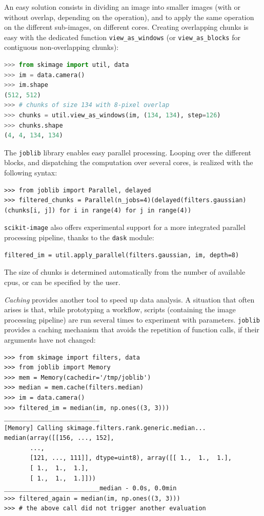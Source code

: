 \documentclass[twocolumn]{bmcart}%
\begin{document}
An easy solution consists in dividing an image into smaller images (with
or without overlap, depending on the operation), and to apply the
same operation on the different sub-images, on different cores. Creating overlapping chunks is easy with the dedicated function \texttt{view\_as\_windows} (or \texttt{view\_as\_blocks} for contiguous non-overlapping chunks):
\begin{lstlisting}[language=Python]
>>> from skimage import util, data
>>> im = data.camera()
>>> im.shape
(512, 512)
>>> # chunks of size 134 with 8-pixel overlap
>>> chunks = util.view_as_windows(im, (134, 134), step=126)
>>> chunks.shape
(4, 4, 134, 134)
\end{lstlisting}
The \texttt{joblib} library enables easy parallel processing. Looping over the different blocks, and dispatching the computation over several cores, is realized with the following syntax:
\begin{lstlisting}
>>> from joblib import Parallel, delayed
>>> filtered_chunks = Parallel(n_jobs=4)(delayed(filters.gaussian)(chunks[i, j]) for i in range(4) for j in range(4))
\end{lstlisting}
\texttt{scikit-image} also offers experimental support for a more integrated parallel processing pipeline, thanks to the \texttt{dask} \citep{dask} module:
\begin{lstlisting}
filtered_im = util.apply_parallel(filters.gaussian, im, depth=8)
\end{lstlisting}
The size of chunks is determined automatically from the number of available cpus, or can be specified by the user.

{\em Caching} provides another tool to speed up data analysis. A situation
that often arises is that, while prototyping a workflow, scripts
(containing the image processing pipeline) are run several times to
experiment with parameters. \texttt{joblib} provides a caching mechanism
that avoids the repetition of function calls, if their arguments have not
changed:
\begin{lstlisting}
>>> from skimage import filters, data
>>> from joblib import Memory
>>> mem = Memory(cachedir='/tmp/joblib')
>>> median = mem.cache(filters.median)
>>> im = data.camera()
>>> filtered_im = median(im, np.ones((3, 3)))
__________________________
[Memory] Calling skimage.filters.rank.generic.median...
median(array([[156, ..., 152],
       ..., 
       [121, ..., 111]], dtype=uint8), array([[ 1.,  1.,  1.],
       [ 1.,  1.,  1.],
       [ 1.,  1.,  1.]]))
__________________________median - 0.0s, 0.0min
>>> filtered_again = median(im, np.ones((3, 3)))
>>> # the above call did not trigger another evaluation
\end{lstlisting}
\end{document}
